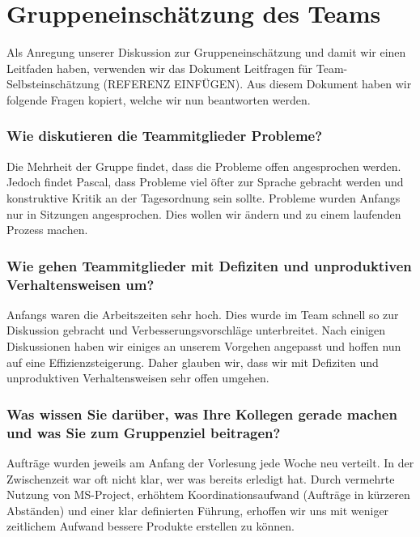 \chapter{Gruppeneinschätzung des Teams}\label{Gruppenteameinschätzung}

Als Anregung unserer Diskussion zur Gruppeneinschätzung und damit wir einen Leitfaden haben, verwenden wir das Dokument Leitfragen für Team-Selbsteinschätzung (REFERENZ EINFÜGEN). Aus diesem Dokument haben wir folgende Fragen kopiert, welche wir nun beantworten werden.
  
\subsection*{Wie diskutieren die Teammitglieder Probleme?}

Die Mehrheit der Gruppe findet, dass die Probleme offen angesprochen werden. Jedoch findet Pascal, dass Probleme viel öfter zur Sprache gebracht werden und konstruktive Kritik an der Tagesordnung sein sollte. 
Probleme wurden Anfangs nur in Sitzungen angesprochen. Dies wollen wir ändern und zu einem laufenden Prozess machen. 

\subsection*{Wie gehen Teammitglieder mit Defiziten und unproduktiven Verhaltensweisen um?}

Anfangs waren die Arbeitszeiten sehr hoch. Dies wurde im Team schnell so zur Diskussion gebracht und Verbesserungsvorschläge unterbreitet. Nach einigen Diskussionen haben wir einiges an unserem Vorgehen angepasst und hoffen nun auf eine Effizienzsteigerung. Daher glauben wir, dass wir mit Defiziten und unproduktiven Verhaltensweisen sehr offen umgehen.

\subsection*{Was wissen Sie darüber, was Ihre Kollegen gerade machen und was Sie zum
Gruppenziel beitragen?}

Aufträge wurden jeweils am Anfang der Vorlesung jede Woche neu verteilt. In der Zwischenzeit war oft nicht klar, wer was bereits erledigt hat. Durch vermehrte Nutzung von MS-Project, erhöhtem Koordinationsaufwand (Aufträge in kürzeren Abständen) und einer klar definierten Führung, erhoffen wir uns mit weniger zeitlichem Aufwand bessere Produkte erstellen zu können.

